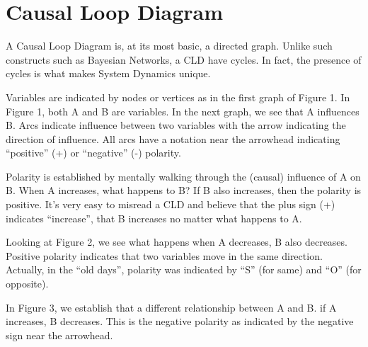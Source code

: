 \documentclass[letterpaper,10pt,english]{sphinxmanual}
\begin{document}
\section{Causal Loop Diagram}
\label{\detokenize{index:Causal-Loop-Diagram}}
A Causal Loop Diagram is, at its most basic, a directed graph. Unlike such constructs such as Bayesian Networks, a CLD  have cycles. In fact, the presence of cycles is what makes System Dynamics unique.

Variables are indicated by nodes or vertices as in the first graph of Figure 1. In Figure 1, both A and B are variables. In the next graph, we see that A influences B. Arcs indicate influence between two variables with the arrow indicating the direction of influence. All arcs have a  notation near the arrowhead indicating “positive” (+) or “negative” (-) polarity.

Polarity is established by mentally walking through the (causal) influence of A on B. When A increases, what happens to B? If B also increases, then the polarity is positive. It’s very easy to misread a CLD and believe that the plus sign (+) indicates “increase”, that B increases no matter what happens to A.


\begin{DUlineblock}{0em}
\item[] 
\end{DUlineblock}

Looking at Figure 2, we see what happens when A decreases, B also decreases. Positive polarity indicates that two variables move in the same direction. Actually, in the “old days”, polarity was indicated by “S” (for same) and “O” (for opposite).


\begin{DUlineblock}{0em}
\item[] 
\end{DUlineblock}

In Figure 3, we establish that a different relationship between A and B. if A increases, B decreases. This is the negative polarity as indicated by the negative sign near the arrowhead.

\end{document}
